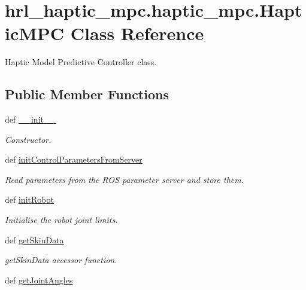 \hypertarget{classhrl__haptic__mpc_1_1haptic__mpc_1_1_haptic_m_p_c}{\section{hrl\-\_\-haptic\-\_\-mpc.\-haptic\-\_\-mpc.\-Haptic\-M\-P\-C \-Class \-Reference}
\label{classhrl__haptic__mpc_1_1haptic__mpc_1_1_haptic_m_p_c}
}


\-Haptic \-Model \-Predictive \-Controller class.  


\subsection*{\-Public \-Member \-Functions}
\begin{DoxyCompactItemize}
\item 
def \hyperlink{classhrl__haptic__mpc_1_1haptic__mpc_1_1_haptic_m_p_c_a9b44020e4e6e1634a1d3857c88abd135}{\-\_\-\-\_\-init\-\_\-\-\_\-}
\begin{DoxyCompactList}\small\item\em \-Constructor. \end{DoxyCompactList}\item 
def \hyperlink{classhrl__haptic__mpc_1_1haptic__mpc_1_1_haptic_m_p_c_a62e268b392834397b60fb3ad59828f83}{init\-Control\-Parameters\-From\-Server}
\begin{DoxyCompactList}\small\item\em \-Read parameters from the \-R\-O\-S parameter server and store them. \end{DoxyCompactList}\item 
def \hyperlink{classhrl__haptic__mpc_1_1haptic__mpc_1_1_haptic_m_p_c_a2215f7a2ca22e4dd683728ce33c9da4d}{init\-Robot}
\begin{DoxyCompactList}\small\item\em \-Initialise the robot joint limits. \end{DoxyCompactList}\item 
def \hyperlink{classhrl__haptic__mpc_1_1haptic__mpc_1_1_haptic_m_p_c_aef2c20f29fbac1f81049c0c43bfd0ce1}{get\-Skin\-Data}
\begin{DoxyCompactList}\small\item\em get\-Skin\-Data accessor function. \end{DoxyCompactList}\item 
def \hyperlink{classhrl__haptic__mpc_1_1haptic__mpc_1_1_haptic_m_p_c_a1e16387ff16aa133f10627378a1eb87a}{get\-Joint\-Angles}

\end{DoxyCompactItemize}
